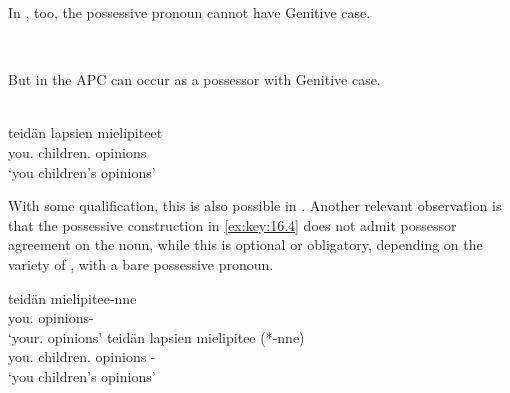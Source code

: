 \documentclass[output=paper]{langsci/langscibook}
\begin{document}
\ea\label{ex:key:16.2}
	\z
\z

In , too, the possessive pronoun cannot have Genitive case.

\ea\label{ex:key:16.3}\\
\z

But in  the \gls{APC} can occur as a possessor with Genitive case.

\ea\label{ex:key:16.4}\\
    \gll teidän       lapsien            mielipiteet \\
        you.\Gen{} children.\Gen{} opinions\\
	\glt    `you children’s opinions'
\z

With some qualification, this is also possible in . Another relevant
observation is that the possessive construction in \eqref{ex:key:16.4} does not admit possessor
agreement on the noun, while this is optional or obligatory, depending on the
variety of , with a bare possessive pronoun.

\ea\label{ex:key:16.5}
	\ea
		\gll teidän       mielipitee-nne \\
			you.\Gen{} opinions-\Spl{}\\
		\glt    `your.\Pl{} opinions'
	\ex
		\gll teidän       lapsien             mielipitee (*-nne)\\
            you.\Gen{} children.\Gen{} opinions \hphantom{(*}-\Spl{}\\
		\glt    `you children’s opinions'
	\z
\z
\end{document}
